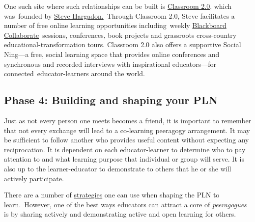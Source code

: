 One such site where such relationships can be built is
\href{http://www.classroom20.com/}{Classroom 2.0}, which was~founded by
\href{http://www.stevehargadon.com/}{Steve Hargadon.}~Through Classroom
2.0, Steve facilitates a number of free online learning opportunities
including~weekly
\href{http://www.google.com/url?q=http\%3A\%2F\%2Fwww.futureofeducation.com\%2Fnotes\%2FPast\_Interviews\&sa=D\&sntz=1\&usg=AFQjCNHVYOvP-w7NTgKp2Fu2AX4YycnPQQ}{Blackboard
Collaborate}~sessions, conferences, book projects and grassroots
cross-country educational-transformation tours. Classroom 2.0 also
offers a supportive Social Ning---a free, social learning space that
provides online conferences and synchronous and recorded interviews with
inspirational educators---for connected~educator-learners around the
world.

\subsection{Phase 4: Building and shaping your PLN}

Just as not every person one meets becomes a friend, it is important to
remember that not every exchange will lead to a co-learning peeragogy
arrangement. It may be sufficient to follow another who provides useful
content without expecting any reciprocation. It is dependent on each
educator-learner to determine who to pay attention to and what learning
purpose that individual or group will serve. It is also up to the
learner-educator to demonstrate to others that he or she will actively
participate.

There are a number of
\href{http://storify.com/digiphile/how-to-build-a-personal-learning-network-on-twitte}{strategies}
one can use when shaping the PLN to learn.~However, one of the best ways
educators can attract a core of \emph{peeragogues} is by sharing
actively and demonstrating active and open learning for others.

